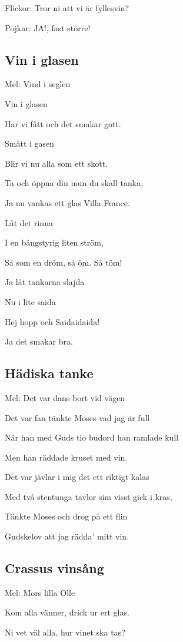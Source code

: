 Flickor: Tror ni att vi är fyllesvin?

Pojkar: JA!, fast större!

\subsection{\textbf{Vin i glasen}}

Mel: Vind i seglen\bigskip

Vin i glasen

Har vi fått och det smakar gott.

Smått i gasen

Blir vi nu alla som ett skott.

Ta och öppna din mun du skall tanka,

Ja nu vankas ett glas Villa France.

Låt det rinna

I en bångstyrig liten ström,

Så som en dröm, så öm. Så töm!

Ja låt tankarna slajda

Nu i lite saida

Hej hopp och Saidaidaida!

Ja det smakar bra.

\subsection{\textbf{Hädiska tanke}}

Mel: Det var dans bort vid vägen\bigskip

Det var fan tänkte Moses vad jag är full

När han med Guds tio budord han ramlade kull

Men han räddade kruset med vin.

Det var jävlar i mig det ett riktigt kalas

Med två stentunga tavlor sim visst gick i kras,

Tänkte Moses och drog på ett flin

Gudskelov att jag rädda’ mitt vin.

\subsection{\textbf{Crassus vinsång}}

Mel: Mors lilla Olle\bigskip

Kom alla vänner, drick ur ert glas.

Ni vet väl alla, hur vinet ska tas?

